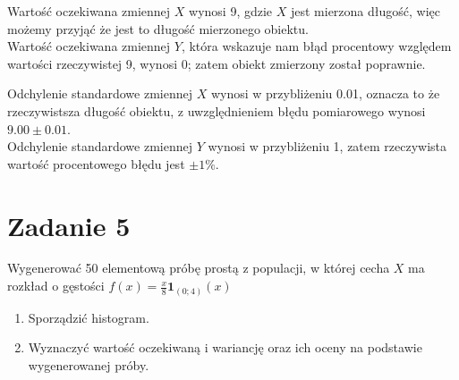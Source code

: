 \documentclass{article}
\begin{document}
Wartość oczekiwana zmiennej $X$ wynosi 9, gdzie $X$ jest mierzona długość, więc możemy przyjąć że jest to długość mierzonego obiektu.\\
Wartość oczekiwana zmiennej $Y$, która wskazuje nam błąd procentowy względem wartości rzeczywistej 9, wynosi 0; zatem obiekt zmierzony został poprawnie. \\ \par
Odchylenie standardowe zmiennej $X$ wynosi w przybliżeniu 0.01, oznacza to że rzeczywistsza długość obiektu, z uwzględnieniem błędu pomiarowego wynosi $9.00 \pm0.01$.\\
Odchylenie standardowe zmiennej $Y$ wynosi w przybliżeniu 1, zatem rzeczywista wartość procentowego błędu jest $\pm1\%$.

\newpage
\section{Zadanie 5}
Wygenerować 50 elementową próbę prostą z populacji, w której cecha $X$ ma rozkład o gęstości $f(x) = \frac{x}{8} \textbf{1}_{(0;4)}(x)$
\begin{enumerate}[label = \alph*)]
\item Sporządzić histogram.
\item Wyznaczyć wartość oczekiwaną i wariancję oraz ich oceny na podstawie wygenerowanej próby.
\end{enumerate}
\end{document}
